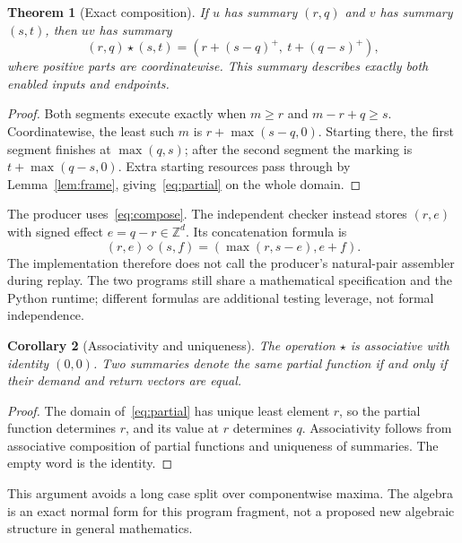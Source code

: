 \documentclass[11pt,a4paper]{article}
\newcommand{\Z}{\mathbb Z}
\newcommand{\pos}[1]{\left(#1\right)^{+}}
\newtheorem{theorem}{Theorem}[section]
\newtheorem{corollary}[theorem]{Corollary}
\theoremstyle{definition}
\theoremstyle{remark}
\begin{document}
\begin{theorem}[Exact composition]\label{thm:compose}
If $u$ has summary $(r,q)$ and $v$ has summary $(s,t)$, then $uv$ has summary
\begin{equation}\label{eq:compose}
 (r,q)\star(s,t)=\left(r+\pos{s-q},\ t+\pos{q-s}\right),
\end{equation}
where positive parts are coordinatewise. This summary describes exactly both enabled inputs and endpoints.
\end{theorem}
\begin{proof}
Both segments execute exactly when $m\ge r$ and $m-r+q\ge s$. Coordinatewise, the least such $m$ is $r+\max(s-q,0)$. Starting there, the first segment finishes at $\max(q,s)$; after the second segment the marking is $t+\max(q-s,0)$. Extra starting resources pass through by Lemma~\ref{lem:frame}, giving~\eqref{eq:partial} on the whole domain.
\end{proof}

The producer uses~\eqref{eq:compose}. The independent checker instead stores $(r,e)$ with signed effect $e=q-r\in\Z^d$. Its concatenation formula is
\begin{equation}\label{eq:signedcompose}
 (r,e)\diamond(s,f)=\left(\max(r,s-e),e+f\right).
\end{equation}
The implementation therefore does not call the producer's natural-pair assembler during replay. The two programs still share a mathematical specification and the Python runtime; different formulas are additional testing leverage, not formal independence.

\begin{corollary}[Associativity and uniqueness]
The operation $\star$ is associative with identity $(0,0)$. Two summaries denote the same partial function if and only if their demand and return vectors are equal.
\end{corollary}
\begin{proof}
The domain of~\eqref{eq:partial} has unique least element $r$, so the partial function determines $r$, and its value at $r$ determines $q$. Associativity follows from associative composition of partial functions and uniqueness of summaries. The empty word is the identity.
\end{proof}
This argument avoids a long case split over componentwise maxima. The algebra is an exact normal form for this program fragment, not a proposed new algebraic structure in general mathematics.
\end{document}
